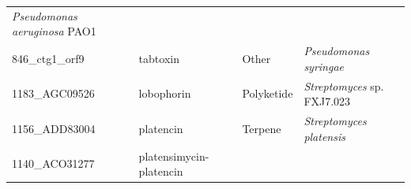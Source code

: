 \documentclass[12pt,twoside]{reedthesis}
\begin{document}
\begin{longtable}[]{@{}llll@{}}
\begin{minipage}[t]{0.34\columnwidth}
  \emph{Pseudomonas aeruginosa} PAO1\strut
  \end{minipage}\tabularnewline
  \begin{minipage}[t]{0.19\columnwidth}\raggedright\strut
  846\_ctg1\_orf9\strut
  \end{minipage} & \begin{minipage}[t]{0.20\columnwidth}\raggedright\strut
  tabtoxin\strut
  \end{minipage} & \begin{minipage}[t]{0.15\columnwidth}\raggedright\strut
  Other\strut
  \end{minipage} & \begin{minipage}[t]{0.34\columnwidth}\raggedright\strut
  \emph{Pseudomonas syringae}\strut
  \end{minipage}\tabularnewline
  \begin{minipage}[t]{0.19\columnwidth}\raggedright\strut
  1183\_AGC09526\strut
  \end{minipage} & \begin{minipage}[t]{0.20\columnwidth}\raggedright\strut
  lobophorin\strut
  \end{minipage} & \begin{minipage}[t]{0.15\columnwidth}\raggedright\strut
  Polyketide\strut
  \end{minipage} & \begin{minipage}[t]{0.34\columnwidth}\raggedright\strut
  \emph{Streptomyces} sp. FXJ7.023\strut
  \end{minipage}\tabularnewline
  \begin{minipage}[t]{0.19\columnwidth}\raggedright\strut
  1156\_ADD83004\strut
  \end{minipage} & \begin{minipage}[t]{0.20\columnwidth}\raggedright\strut
  platencin\strut
  \end{minipage} & \begin{minipage}[t]{0.15\columnwidth}\raggedright\strut
  Terpene\strut
  \end{minipage} & \begin{minipage}[t]{0.34\columnwidth}\raggedright\strut
  \emph{Streptomyces platensis}\strut
  \end{minipage}\tabularnewline
  \begin{minipage}[t]{0.19\columnwidth}\raggedright\strut
  1140\_ACO31277\strut
  \end{minipage} & \begin{minipage}[t]{0.20\columnwidth}\raggedright\strut
  platensimycin- platencin\strut

\end{minipage}
\end{longtable}
\end{document}
